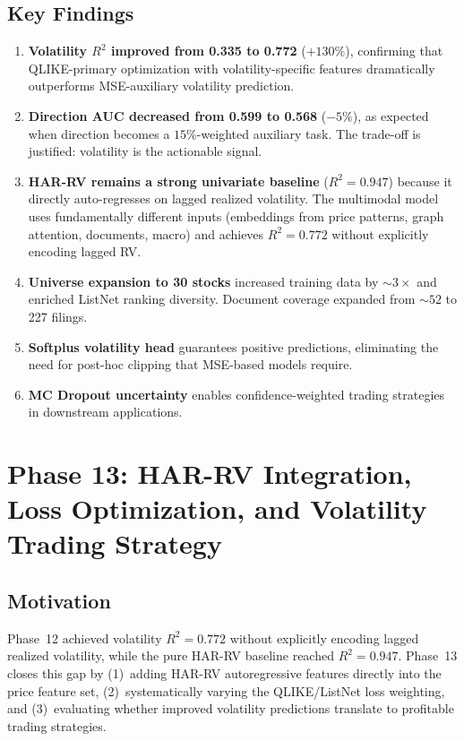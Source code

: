 \documentclass[12pt,a4paper]{article}
\begin{document}
\subsection{Key Findings}
\begin{enumerate}
    \item \textbf{Volatility $R^2$ improved from 0.335 to 0.772} ($+130\%$),
          confirming that QLIKE-primary optimization with volatility-specific
          features dramatically outperforms MSE-auxiliary volatility prediction.
    \item \textbf{Direction AUC decreased from 0.599 to 0.568} ($-5\%$),
          as expected when direction becomes a $15\%$-weighted auxiliary task.
          The trade-off is justified: volatility is the actionable signal.
    \item \textbf{HAR-RV remains a strong univariate baseline} ($R^2=0.947$)
          because it directly auto-regresses on lagged realized volatility.
          The multimodal model uses fundamentally different inputs (embeddings
          from price patterns, graph attention, documents, macro) and achieves
          $R^2=0.772$ without explicitly encoding lagged RV.
    \item \textbf{Universe expansion to 30 stocks} increased training data
          by $\sim3\times$ and enriched ListNet ranking diversity.
          Document coverage expanded from $\sim52$ to 227 filings.
    \item \textbf{Softplus volatility head} guarantees positive predictions,
          eliminating the need for post-hoc clipping that MSE-based models require.
    \item \textbf{MC Dropout uncertainty} enables confidence-weighted trading
          strategies in downstream applications.
\end{enumerate}

\section{Phase 13: HAR-RV Integration, Loss Optimization, and Volatility Trading Strategy}

\subsection{Motivation}
Phase~12 achieved volatility $R^2=0.772$ without explicitly encoding lagged realized
volatility, while the pure HAR-RV baseline reached $R^2=0.947$.  Phase~13 closes this
gap by (1)~adding HAR-RV autoregressive features directly into the price feature set,
(2)~systematically varying the QLIKE/ListNet loss weighting, and (3)~evaluating whether
improved volatility predictions translate to profitable trading strategies.
\end{document}
